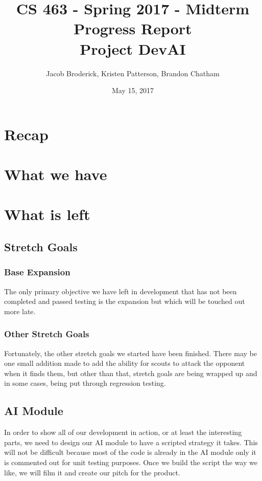 \documentclass[10pt,letterpaper,onecolumn,draftclsnofoot]{IEEEtran}
\begin{document}
	
	\begin{titlepage}
		
		\title{CS 463 - Spring 2017 - Midterm Progress Report \\ Project DevAI}
		\author{Jacob Broderick, Kristen Patterson, Brandon Chatham}
		\date{May 15, 2017}
		\maketitle
		\vspace{4cm}
	\end{titlepage}

\section{Recap}


\section{What we have}


\section{What is left}
\subsection{Stretch Goals}

\subsubsection{Base Expansion}
The only primary objective we have left in development that has not been completed and passed testing is the expansion but which will be touched out more late. 
\subsubsection{Other Stretch Goals}
Fortunately, the other stretch goals we started have been finished. There may be one small addition made to add the ability for scouts to attack the opponent when it finds them, but other than that, stretch goals are being wrapped up and in some cases, being put through regression testing. 
\subsection{AI Module}
In order to show all of our development in action, or at least the interesting parts, we need to design our AI module to have a scripted strategy it takes. This will not be difficult because most of the code is already in the AI module only it is commented out for unit testing purposes. Once we build the script the way we like, we will film it and create our pitch for the product. 
\end{document}
